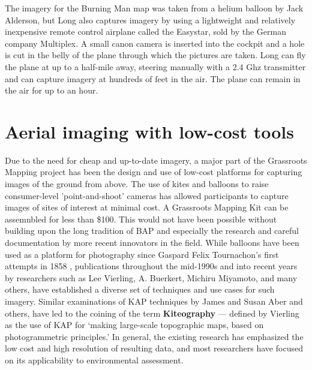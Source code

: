\documentclass[11pt,oneside,notitlepage]{report}
\begin{document}
The imagery for the Burning Man map was taken from a helium balloon by Jack Alderson, but Long also captures imagery by using a lightweight and relatively inexpensive remote control airplane called the Easystar, sold by the German company Multiplex. A small canon camera is inserted into the cockpit and a hole is cut in the belly of the plane through which the pictures are taken. Long can fly the plane at up to a half-mile away, steering manually with a 2.4 Ghz transmitter and can capture imagery at hundreds of feet in the air. The plane can remain in the air for up to an hour.  

\section{Aerial imaging with low-cost tools}
\label{sec:aeriallowcost}

Due to the need for cheap and up-to-date imagery, a major part of the Grassroots Mapping project has been the design and use of low-cost platforms for capturing images of the ground from above. The use of kites and balloons to raise consumer-level 'point-and-shoot' cameras has allowed participants to capture images of sites of interest at minimal cost. A Grassroots Mapping Kit can be assemnbled for less than \$100. This would not have been possible without building upon the long tradition of \ac{BAP} and especially the research and careful documentation by more recent innovators in the field. While balloons have been used as a platform for photography since Gaspard Felix Tournachon's first attempts in 1858 \cite{vierling2006short}, publications throughout the mid-1990s and into recent years by researchers such as Lee Vierling, A. Buerkert, Michiru Miyamoto, and many others, have established a diverse set of techniques and use cases for such imagery. Similar examinations of \ac{KAP} techniques by James and Susan Aber and others, have led to the coining of the term \textbf{Kiteography} --- defined by Vierling as the use of \ac{KAP} for `making large-scale topographic maps, based on photogrammetric principles.' \cite{vierling2006short} In general, the existing research has emphasized the low cost and high resolution of resulting data, and most researchers have focused on its applicability to environmental assessment. \cite{aber1999kite}\cite{aber2002unmanned}\cite{miyamoto2004use}\cite{boike2003mapping}
\end{document}
